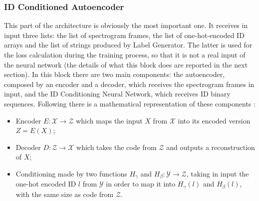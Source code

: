 \subsubsection{ID Conditioned Autoencoder}
This part of the architecture is obviously the most important one. It receives in input three lists: the list of spectrogram frames, the list of one-hot-encoded ID arrays and the list of strings produced by Label Generator. The latter is used for the loss calculation during the training process, so that it is not a real input of the neural network (the details of what this block does are reported in the next section). In this block there are two main components: the autoencoder, composed by an encoder and a decoder, which receives the spectrogram frames in input, and the ID Conditioning Neural Network, which receives ID binary sequences. Following there is a mathematical representation of these components \cite{18IDConditionedAutoEncoder}:
\begin{itemize}
    \item {Encoder $E: \mathcal{X} \rightarrow \mathcal{Z}$ which maps the input $X$ from $\mathcal{X}$ into its encoded version $Z = E(X)$;}
    \item {Decoder $D:  \mathcal{Z} \rightarrow \mathcal{X}$ which takes the code from $\mathcal{Z}$ and outputs a reconstruction of $X$; }
    \item {Conditioning made by two functions $H_\gamma$ and $H_\beta: \mathcal{Y} \rightarrow \mathcal{Z}$, taking in input the one-hot encoded ID $l$ from $\mathcal{Y}$ in order to map it into $H_\gamma(l)$ and $H_\beta(l)$, with the same size as code from $\mathcal{Z}$.}
\end{itemize}
